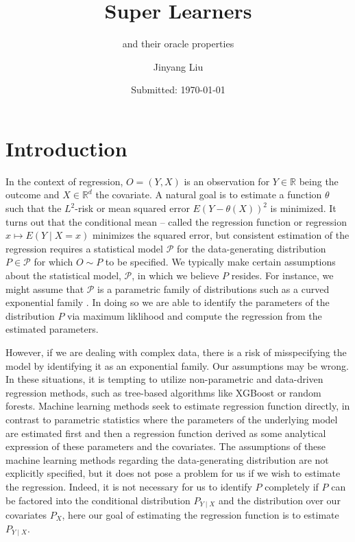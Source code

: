\documentclass[11pt, a4paper]{article}
\author{Jinyang Liu}
\title{Super Learners}
\subtitle{and their oracle properties}
\date{Submitted: \today}
\theoremstyle{definition}
\theoremstyle{remark}
\begin{document}
\begingroup
    \selectfont
    \maketitle
    \tableofcontents
    \newpage
\endgroup


\section{Introduction}
In the context of regression, $ O = (Y, X) $ is an observation for $ Y \in \mathbb{R} $ being the outcome and $ X \in \mathbb{R}^{d} $ the covariate. A natural goal is to estimate a function $ \theta $ such that the $ L^2 $-risk or mean squared error $ E(Y - \theta(X))^2 $ is minimized. It turns out that the conditional mean -- called the regression function or regression $ x \mapsto E(Y \mid X = x) $ minimizes the squared error, but consistent estimation of the regression requires a statistical model $ \mathcal{P} $ for the data-generating distribution $ P \in \mathcal{P} $ for which $ O \sim P $ to be specified. We typically make certain assumptions about the statistical model, $\mathcal{P}$, in which we believe $P$ resides. For instance, we might assume that $\mathcal{P}$ is a parametric family of distributions such as a curved exponential family \parencite{lauritzen2023fundamentals}. In doing so we are able to identify the parameters of the distribution $ P $ via maximum liklihood and compute the regression from the estimated parameters.

However, if we are dealing with complex data, there is a risk of misspecifying the model by identifying it as an exponential family. Our assumptions may be wrong. In these situations, it is tempting to utilize non-parametric and data-driven regression methods, such as tree-based algorithms like XGBoost or random forests. Machine learning methods seek to estimate regression function directly, in contrast to parametric statistics where the parameters of the underlying model are estimated first and then a regression function derived as some analytical expression of these parameters and the covariates. The assumptions of these machine learning methods regarding the data-generating distribution are not explicitly specified, but it does not pose a problem for us if we wish to estimate the regression. Indeed, it is not necessary for us to identify $ P $ completely if $ P $ can be factored into the conditional distribution $ P_{Y \mid X} $ and the distribution over our covariates $ P_X $, here our goal of estimating the regression function is to estimate $ P_{Y \mid X} $.   
\end{document}
